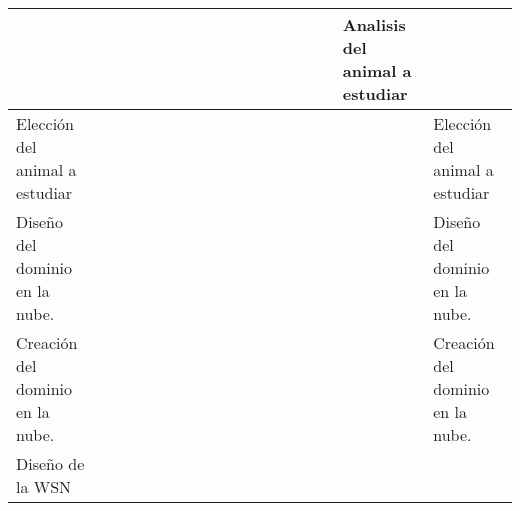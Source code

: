 \begin{table}[H]
{\begin{tabular}{|l|llllllllllllllll|l|}
  \multicolumn{1}{l|}{} &
  \multicolumn{1}{l|}{} &
  \multicolumn{1}{l|}{} &
  \multicolumn{1}{l|}{} &
  \multicolumn{1}{l|}{} &
  \multicolumn{1}{l|}{\cellcolor[HTML]{F4B084}} &
  \multicolumn{1}{l|}{\cellcolor[HTML]{F4B084}} &
  \multicolumn{1}{l|}{\cellcolor[HTML]{F4B084}} &
  \multicolumn{1}{l|}{\cellcolor[HTML]{F4B084}} &
  \multicolumn{1}{l|}{} &
  \multicolumn{1}{l|}{} &
  \multicolumn{1}{l|}{} &
  \multicolumn{1}{l|}{} &
  \multicolumn{1}{l|}{} &
  \multicolumn{1}{l|}{} &
   &
  Analisis del animal a estudiar \\ \hline
Elección del animal a estudiar &
  \multicolumn{1}{l|}{} &
  \multicolumn{1}{l|}{} &
  \multicolumn{1}{l|}{} &
  \multicolumn{1}{l|}{} &
  \multicolumn{1}{l|}{} &
  \multicolumn{1}{l|}{} &
  \multicolumn{1}{l|}{} &
  \multicolumn{1}{l|}{} &
  \multicolumn{1}{l|}{\cellcolor[HTML]{F4B084}} &
  \multicolumn{1}{l|}{\cellcolor[HTML]{F4B084}} &
  \multicolumn{1}{l|}{} &
  \multicolumn{1}{l|}{} &
  \multicolumn{1}{l|}{} &
  \multicolumn{1}{l|}{} &
  \multicolumn{1}{l|}{} &
   &
  Elección del animal a estudiar \\ \hline
Diseño del dominio en la nube. &
  \multicolumn{1}{l|}{} &
  \multicolumn{1}{l|}{} &
  \multicolumn{1}{l|}{} &
  \multicolumn{1}{l|}{} &
  \multicolumn{1}{l|}{} &
  \multicolumn{1}{l|}{} &
  \multicolumn{1}{l|}{} &
  \multicolumn{1}{l|}{} &
  \multicolumn{1}{l|}{\cellcolor[HTML]{BDD7EE}} &
  \multicolumn{1}{l|}{\cellcolor[HTML]{BDD7EE}} &
  \multicolumn{1}{l|}{\cellcolor[HTML]{BDD7EE}} &
  \multicolumn{1}{l|}{\cellcolor[HTML]{BDD7EE}} &
  \multicolumn{1}{l|}{} &
  \multicolumn{1}{l|}{} &
  \multicolumn{1}{l|}{} &
   &
  Diseño del dominio en la nube. \\ \hline
Creación del dominio en la nube. &
  \multicolumn{1}{l|}{} &
  \multicolumn{1}{l|}{} &
  \multicolumn{1}{l|}{} &
  \multicolumn{1}{l|}{} &
  \multicolumn{1}{l|}{} &
  \multicolumn{1}{l|}{} &
  \multicolumn{1}{l|}{} &
  \multicolumn{1}{l|}{} &
  \multicolumn{1}{l|}{} &
  \multicolumn{1}{l|}{\cellcolor[HTML]{BDD7EE}} &
  \multicolumn{1}{l|}{\cellcolor[HTML]{BDD7EE}} &
  \multicolumn{1}{l|}{\cellcolor[HTML]{BDD7EE}} &
  \multicolumn{1}{l|}{\cellcolor[HTML]{BDD7EE}} &
  \multicolumn{1}{l|}{} &
  \multicolumn{1}{l|}{} &
   &
  Creación del dominio en la nube. \\ \hline
Diseño de la WSN &
  \multicolumn{1}{l|}{} &
  \multicolumn{1}{l|}{} &
  \multicolumn{1}{l|}{} &
  \multicolumn{1}{l|}{} &
  \multicolumn{1}{l|}{} &
  \multicolumn{1}{l|}{} &
  \multicolumn{1}{l|}{} &
  \multicolumn{1}{l|}{} &
  \multicolumn{1}{l|}{} &

\end{tabular}}
\end{table}
